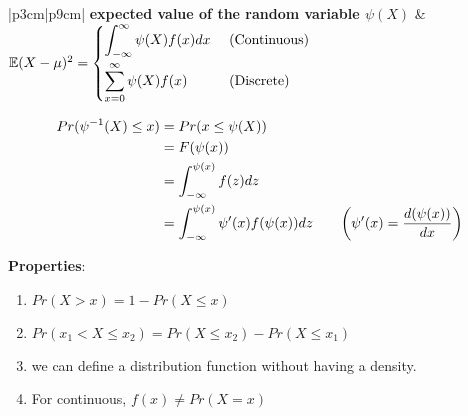 \begin{alternateColorTable}
\begin{longtable}{|p{3cm}|p{9cm}|}
    \textbf{expected value of the random variable $\psi(X)$} &
    \vspace{0.1cm} \(
        \mathbb{E}(X-\mu)^2 =
        \begin{cases}
            \displaystyle\int_{-\infty}^\infty \psi(X) f(x)dx &
            \text{ (Continuous)}\\[2ex]
            \displaystyle\sum_{x=0}^\infty \psi(X) f(x) &
            \text{ (Discrete)}\\
        \end{cases}
    \) \vspace{0.1cm} \\
    \hline

\end{longtable}
\renewcommand{\arraystretch}{1}
\end{alternateColorTable}


\begin{align*}
    Pr(\psi^{-1}(X) \leq x) 
    &= Pr(x\leq\psi(X)) \\
    &= F(\psi(x)) \\
    &= \displaystyle\int_{-\infty}^{\psi(x)} f(z)dz\\
    &= \displaystyle\int_{-\infty}^{\psi(x)} \psi'(x) f(\psi(x))dz &&& \left( \psi'(x) = \dfrac{d(\psi(x))}{dx} \right)\\
\end{align*}

\textbf{Properties}:
\begin{enumerate}
    \item $Pr(X > x) = 1 - Pr(X \leq x)$

    \item $Pr(x_1 < X \leq x_2) = Pr(X \leq x_2) - Pr(X \leq x_1)$

    \item we can define a distribution function without having a density. 

    \item For continuous, $f(x) \neq Pr(X = x)$

\end{enumerate}




































